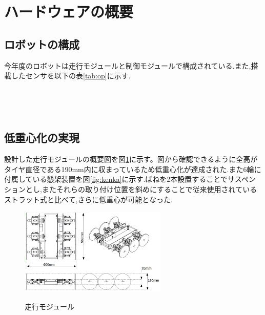 \documentclass[twocolumn,11pt]{sotsuken_abst}
\begin{document}
\section{ハードウェアの概要}
\subsection{ロボットの構成}

今年度のロボットは走行モジュールと制御モジュールで構成されている.また,搭載したセンサを以下の表\ref{tab:op}に示す.


\begin{table}[h]
 　\begin{center}
    \caption{ハードウェアの構成}
    \small
　   \label{tab:op}
  \end{center}
\end{table}


\subsection{低重心化の実現}
設計した走行モジュールの概要図を図\ref{fig:cad}に示す。図から確認できるように全高がタイヤ直径である190mm内に収まっているため低重心化が達成された.また6輪に付属している懸架装置を図\ref{fig:kenka}に示す.ばねを2本設置することでサスペンションとし,またそれらの取り付け位置を斜めにすることで従来使用されているストラット式と比べて,さらに低重心が可能となった.

\begin{figure}[htp]
 \begin{center}
  \includegraphics[width=70mm]{image/4.png}
 　\caption{走行モジュール}
  \label{fig:cad}%
 \end{center}
\end{figure}
\end{document}
